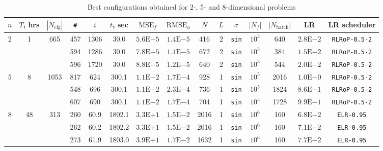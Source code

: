\documentclass[reprint,
superscriptaddress,
amsmath,amssymb,aps,showkeys,showpacs,
twoside,final,secnumarabic,%
nofootinbib]{revtex4-2}
\begin{document}
\begin{table}
\renewcommand{\arraystretch}{1.25}
\renewcommand{\tabcolsep}{3pt}
\caption{Best configurations obtained for 2-, 5- and 8-dimensional problems}
\label{best_cfgs}
\begin{tabular}{|*{15}{c|}}\hline
$n$ & $T$, hrs & $|N_\mathrm{cfg}|$ & \verb|#| & $i$ & $t$, sec & $\mathrm{MSE}_f$ & $\mathrm{RMSE}_u$ & $N$ & $L$ & $\sigma$ & $|N_f|$ & $|N_\mathrm{batch}|$ & LR & LR scheduler \\ \hline

\multirow{3}{*}{2} & \multirow{3}{*}{1} & \multirow{3}{*}{665} & 457 & 1306 & 30.0 & $5.6\mathrm{E}{-5}$ & $1.4\mathrm{E}{-5}$ & 416 & 2 & \texttt{sin} & $10^3$ & 640 & $2.8\mathrm{E}{-2}$ & \texttt{RLRoP-0.5-2} \\ \cline{4-15}

& & & 594 & 1286 & 30.0 & $7.8\mathrm{E}{-5}$ & $1.1\mathrm{E}{-5}$ & 672 & 2 & \texttt{sin} & $10^3$ & 384 & $1.5\mathrm{E}{-2}$ & \texttt{RLRoP-0.5-2} \\ \cline{4-15}

& & & 596 & 1720 & 30.0 & $8.8\mathrm{E}{-5}$ & $1.2\mathrm{E}{-5}$ & 640 & 2 & \texttt{sin} & $10^3$ & 544 & $2.0\mathrm{E}{-2}$ & \texttt{RLRoP-0.5-2} \\ \hline

\multirow{3}{*}{5} & \multirow{3}{*}{8} & \multirow{3}{*}{1053} & 817 & 624 & 300.1 & $1.1\mathrm{E}{-2}$ & $1.7\mathrm{E}{-4}$ & 928 & 1 & \texttt{sin} & $10^5$ & 2016 & $1.0\mathrm{E}{-0}$ & \texttt{RLRoP-0.5-2} \\ \cline{4-15}

& & & 548 & 696 & 300.1 & $1.1\mathrm{E}{-2}$ & $2.3\mathrm{E}{-4}$ & 736 & 1 & \texttt{sin} & $10^5$ & 1824 & $8.6\mathrm{E}{-1}$ & \texttt{RLRoP-0.5-2} \\ \cline{4-15}

& & & 607 & 690 & 300.1 & $1.1\mathrm{E}{-2}$ & $1.7\mathrm{E}{-4}$ & 704 & 1 & \texttt{sin} & $10^5$ & 1728 & $9.9\mathrm{E}{-1}$ & \texttt{RLRoP-0.5-2} \\ \hline

\multirow{3}{*}{8} & \multirow{3}{*}{48} & \multirow{3}{*}{313} & 260 & 60.9 & 1802.1 & $3.3\mathrm{E}{+1}$ & $1.5\mathrm{E}{-2}$ & 2016 & 1 & \texttt{sin} & $10^6$ & 160 & $6.8\mathrm{E}{-2}$ & \texttt{ELR-0.95} \\ \cline{4-15}

& & & 262 & 60.2 & 1802.2 & $3.3\mathrm{E}{+1}$ & $1.5\mathrm{E}{-2}$ & 2016 & 1 & \texttt{sin} & $10^6$ & 160 & $7.1\mathrm{E}{-2}$ & \texttt{ELR-0.95} \\ \cline{4-15}

& & & 273 & 61.9 & 1803.0 & $3.9\mathrm{E}{+1}$ & $1.7\mathrm{E}{-2}$ & 1632 & 1 & \texttt{sin} & $10^6$ & 160 & $7.7\mathrm{E}{-2}$ & \texttt{ELR-0.95} \\ \hline
\end{tabular}
\end{table}
\end{document}

